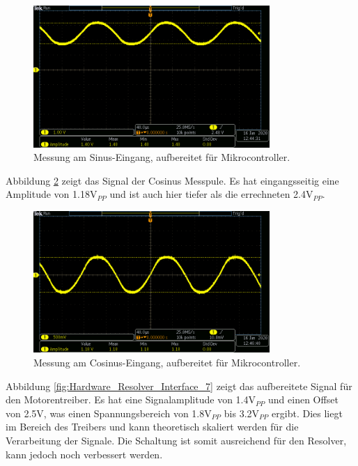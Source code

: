 \begin{figure}[h!]
	\centering
	\includegraphics[width=0.8\textwidth]{graphics/Resolver_Sin_Verst_1.png}
	\caption{Messung am Sinus-Eingang, aufbereitet für Mikrocontroller.} 
	\label{fig:Hardware_Resolver_Interface_5}
\end{figure}

Abbildung \ref{fig:Hardware_Resolver_Interface_6} zeigt das Signal der Cosinus Messpule. Es hat eingangsseitig eine Amplitude von 1.18V$_{PP}$ und ist auch hier tiefer als die errechneten 2.4V$_{PP}$.

\begin{figure}[h!]
	\centering
	\includegraphics[width=0.8\textwidth]{graphics/Resolver_Sin_Ein_2.png}
	\caption{Messung am Cosinus-Eingang, aufbereitet für Mikrocontroller.} 
	\label{fig:Hardware_Resolver_Interface_6}
\end{figure}
\newpage
Abbildung \ref{fig:Hardware_Resolver_Interface_7} zeigt das aufbereitete Signal für den Motorentreiber. Es hat eine Signalamplitude von 1.4V$_{PP}$ und einen Offset von 2.5V, was einen Spannungsbereich von 1.8V$_{PP}$ bis 3.2V$_{PP}$ ergibt. Dies liegt im Bereich des Treibers und kann theoretisch skaliert werden für die Verarbeitung der Signale. Die Schaltung ist somit ausreichend für den Resolver, kann jedoch noch verbessert werden.

